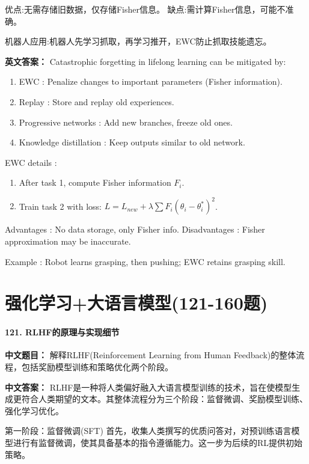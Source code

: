 \documentclass[10pt,a4paper]{ctexart}
\begin{document}
 优点:无需存储旧数据，仅存储Fisher信息。
 缺点:需计算Fisher信息，可能不准确。

 机器人应用:机器人先学习抓取，再学习推开，EWC防止抓取技能遗忘。

\textbf{英文答案：}  
Catastrophic forgetting in lifelong learning can be mitigated by:

\begin{enumerate}
    \item EWC : Penalize changes to important parameters (Fisher information).
    \item Replay : Store and replay old experiences.
    \item Progressive networks : Add new branches, freeze old ones.
    \item Knowledge distillation : Keep outputs similar to old network.
\end{enumerate}

 EWC details :
\begin{enumerate}
    \item After task 1, compute Fisher information \(F_i\).
    \item Train task 2 with loss: \(L = L_{new} + \lambda \sum F_i (\theta_i - \theta_i^*)^2\).
\end{enumerate}

 Advantages : No data storage, only Fisher info.
 Disadvantages : Fisher approximation may be inaccurate.

 Example : Robot learns grasping, then pushing; EWC retains grasping skill.

\part{强化学习+大语言模型(121-160题)}

\subsection*{121. RLHF的原理与实现细节}
\textbf{中文题目：} 解释RLHF(Reinforcement Learning from Human Feedback)的整体流程，包括奖励模型训练和策略优化两个阶段。

\textbf{中文答案：}  
RLHF是一种将人类偏好融入大语言模型训练的技术，旨在使模型生成更符合人类期望的文本。其整体流程分为三个阶段：监督微调、奖励模型训练、强化学习优化。

 第一阶段：监督微调(SFT)   
首先，收集人类撰写的优质问答对，对预训练语言模型进行有监督微调，使其具备基本的指令遵循能力。这一步为后续的RL提供初始策略。
\end{document}
